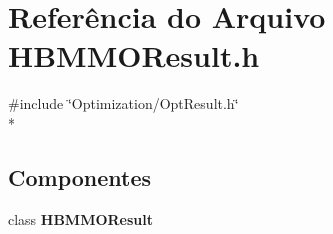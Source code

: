 \section{Referência do Arquivo H\+B\+M\+M\+O\+Result.\+h}
\label{_h_b_m_m_o_result_8h}
{\ttfamily \#include \char`\"{}Optimization/\+Opt\+Result.\+h\char`\"{}}\\*
\subsection*{Componentes}
\begin{DoxyCompactItemize}
\item 
class {\bf H\+B\+M\+M\+O\+Result}
\end{DoxyCompactItemize}
